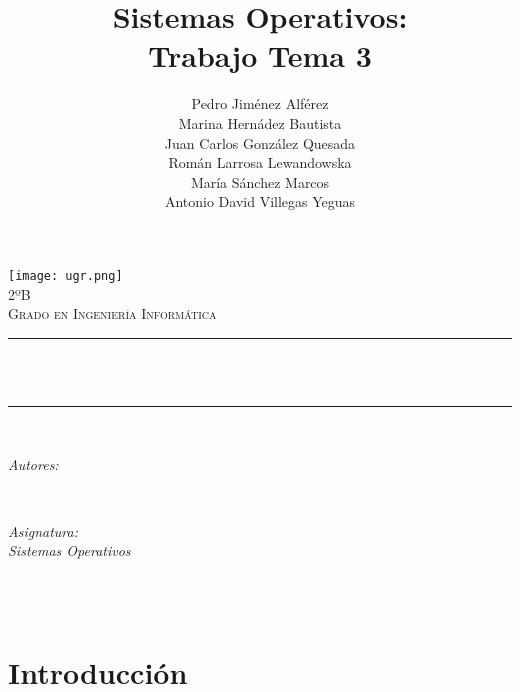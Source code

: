 \documentclass[12pt, spanish]{article}
\title{Sistemas Operativos:\\
Trabajo Tema 3  \hspace{0.05cm} }
\author{Pedro Jiménez Alférez \\
Marina Hernádez Bautista  \\
Juan Carlos González Quesada \\
Román Larrosa Lewandowska \\
María Sánchez Marcos \\
Antonio David Villegas Yeguas	}
\makeatletter
\let\thetitle\@title
\let\theauthor\@author
\let\thedate\@date
\makeatother
\begin{document}

\begin{titlepage}
    \centering
    \vspace*{0.5 cm}
    \texttt{[image: ugr.png]}\\[1.0 cm]
    \textsc{\large 2ºB}\\[0.5 cm]            
    \textsc{\large Grado en Ingeniería Informática}\\[0.5 cm]              
    \rule{\linewidth}{0.2 mm} \\[0.4 cm]
    { \huge \bfseries \thetitle}\\
    \rule{\linewidth}{0.2 mm} \\[1.5 cm]
    
    \begin{minipage}{0.4\textwidth}
        \begin{flushleft} \large
            \emph{Autores:}\\
            
            \small \theauthor
            \end{flushleft}
            \end{minipage}~
            \begin{minipage}{0.4\textwidth}
            \begin{flushright} \large
            \emph{Asignatura: \\
            Sistemas Operativos}                   
        \end{flushright}
    \end{minipage}\\[1 cm]
  	
    {\small \thedate}\\[1 cm]
 	
    \vfill
    
\end{titlepage}

\newpage



\tableofcontents
\pagebreak


\section{Introducción}
\end{document}

